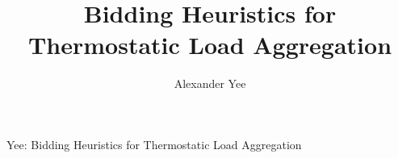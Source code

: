 \documentclass[journal]{IEEEtran}
\begin{document}
%
\title{Bidding Heuristics for Thermostatic Load Aggregation}
%
%
%

\author{Alexander Yee}

% 
%



%
{Yee: Bidding Heuristics for Thermostatic Load Aggregation}
% 
\end{document}
